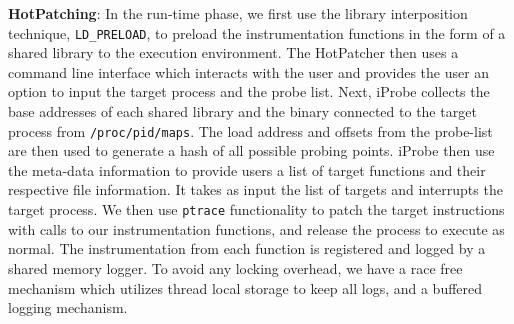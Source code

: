\indent \textbf{HotPatching}: 
In the run-time phase, we first use the library interposition technique, \texttt{LD\_PRELOAD}, to preload the instrumentation functions in the form of a shared library to the execution environment. 
The HotPatcher then uses a command line interface which interacts with the user and provides the user an option to input the target process and the probe list.
Next, iProbe collects the base addresses of each shared library and the binary connected to the target process from \texttt{/proc/pid/maps}.
The load address and offsets from the probe-list are then used to generate a hash of all possible probing points. 
iProbe then use the meta-data information to provide users a list of target functions and their respective file information.  
It takes as input the list of targets and interrupts the target process. 
We then use \texttt{ptrace} functionality to patch the target instructions with calls to our instrumentation functions, and release the process to execute as normal.
The instrumentation from each function is registered and logged by a shared memory logger. 
To avoid any locking overhead, we have a race free mechanism which
utilizes thread local storage to keep all logs, and a buffered logging mechanism.


